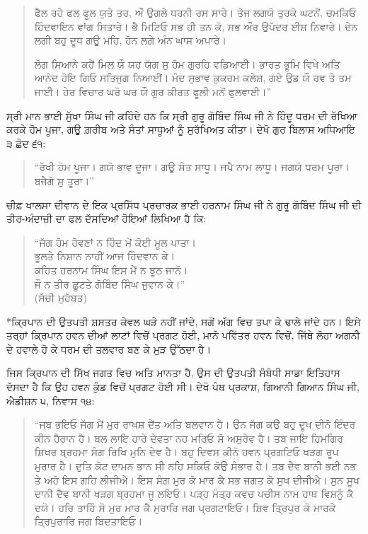 \documentclass[12pt,a5paper,twoside]{book}  %
\makeatletter
\renewcommand\section{\@startsection{section}{1}{0pt}{1.2em}{0.6em}{\punjabifont\Large\bfseries}}%
\makeatother
\begin{document}
{\begin{quote}
ਫੈਲ ਰਹੇ ਫਲ ਫੂਲ ਯੁਤੇ ਤਰ, ਔ ਉਗਲੇ ਧਰਨੀ ਰਸ ਸਾਰੇ। ਤੇਜ ਲਗਯੋ ਤੁਰਕੇ ਘਟਨੋਂ, ਚਮਕਿਓ ਹਿੰਦਵਾਇਨ ਵਾਂਗ ਸਿਤਾਰੇ। ਭੈ ਮਿਟਿਓ ਸਭ ਹੀ ਤਨ ਕੋ, ਸਭ ਔਰ ਉਪੱਦਰ ਈਸ਼ ਨਿਵਾਰੇ। ਦੇਨ ਲਗੀ ਬਹੁ ਦੂਧ ਗਊ ਮਹਿ, ਹੋਨ ਲਗੇ ਅੰਨ ਘਾਸ ਅਪਾਰੇ।

ਲੋਗ ਸਿਆਨੇ ਕਹੈਂ ਮਿਲ ਯੌ ਯਹ ਯੱਗ ਸੁ ਹੋਮ ਗੁਰਹਿ ਵਡਿਆਈ। ਭਾਰਤ ਭੂਮਿ ਵਿਖੇ ਅਤਿ ਆਨੰਦ ਹੋਇ ਗਿਓ ਸਤਿਜੁਗ ਨਿਆਈਂ। ਮੰਦ ਸੁਭਾਵ ਕੁਕਰਮ ਕਲੇਸ਼, ਗਏ ਉਡ ਯੌ ਰਵ ਤੇ ਤਮ ਜਾਈ। ਹੇਰ ਵਿਚਾਰ ਘਰੋ ਘਰ ਯੌ ਗੁਰ ਕੀਰਤ ਫੂਲੀ ਮਨੋਂ ਫੁਲਵਾਈ।”
\end{quote}
ਸ੍ਰੀ ਮਾਨ ਭਾਈ ਸੁੱਖਾ ਸਿੰਘ ਜੀ ਕਹਿੰਦੇ ਹਨ ਕਿ ਸ੍ਰੀ ਗੁਰੂ ਗੋਬਿੰਦ ਸਿੰਘ ਜੀ ਨੇ ਹਿੰਦੂ ਧਰਮ ਦੀ ਰੱਖਿਆ ਕਰਕੇ ਹੋਮ ਪੂਜਾ, ਗਊ ਗ਼ਰੀਬ ਅਤੇ ਸੰਤਾਂ ਸਾਧੂਆਂ ਨੂੰ ਸੁਰੱਖਿਅਤ ਕੀਤਾ। ਦੇਖੋ ਗੁਰ ਬਿਲਾਸ ਅਧਿਆਇ ੩ ਛੰਦ ੬੧:
\begin{quote}
“ਰੱਖੀ ਹੋਮ ਪੂਜਾ। ਗਯੋ ਭਾਵ ਦੂਜਾ। ਗਊ ਸੰਤ ਸਾਧੂ। ਜਪੈ ਨਾਮ ਲਾਧੂ। ਜਗਯੋ ਧਰਮ ਪੂਰਾ। ਬਜੈਗੋ ਸੁ ਤੂਰਾ।”
\end{quote}
ਚੀਫ਼ ਖਾਲਸਾ ਦੀਵਾਨ ਦੇ ਇਕ ਪ੍ਰਸਿੱਧ ਪ੍ਰਚਾਰਕ ਭਾਈ ਹਰਨਾਮ ਸਿੰਘ ਜੀ ਨੇ ਗੁਰੂ ਗੋਬਿੰਦ ਸਿੰਘ ਜੀ ਦੀ ਤੀਰ-ਅੰਦਾਜ਼ੀ ਦਾ ਫਲ ਦੱਸਦਿਆਂ ਹੋਇਆਂ ਲਿਖਿਆ ਹੈ ਕਿ:
\begin{quote}
“ਜੱਗ ਹੋਮ ਹੋਵਣਾਂ ਨ ਹਿੰਦ ਮੇਂ ਕੋਈ ਮੂਲ ਪਾਤਾ। \\
ਭੂਲਤੇ ਨਿਸ਼ਾਨ ਨਾਹੀਂ ਆਜ ਹਿੰਦਵਾਨ ਕੇ। \\
ਕਹਿਤ ਹਰਨਾਮ ਸਿੰਘ ਇਸ ਮੈਂ ਨ ਝੂਠ ਜਾਨੋ। \\
ਜੌ ਨ ਤੀਰ ਛੂਟਤੇ ਗੋਬਿੰਦ ਸਿੰਘ ਜੁਵਾਨ ਕੇ।” \\
(ਸੱਚੀ ਮੁਹੱਬਤ)
\end{quote}

\section*{ਕ੍ਰਿਪਾਨ ਦੀ ਉਤਪਤੀ}
ਸ਼ਸਤਰ ਕੇਵਲ ਘੜੇ ਨਹੀਂ ਜਾਂਦੇ, ਸਗੋਂ ਅੱਗ ਵਿਚ ਤਪਾ ਕੇ ਢਾਲੇ ਜਾਂਦੇ ਹਨ। ਇਸੇ ਤਰ੍ਹਾਂ ਕ੍ਰਿਪਾਨ ਹਵਨ ਦੀਆਂ ਲਾਟਾਂ ਵਿਚੋਂ ਪ੍ਰਗਟ ਹੋਈ, ਮਾਨੋ ਪਵਿੱਤਰ ਹਵਨ ਵਿਚੋਂ, ਜਿੱਥੇ ਲੋਹਾ ਅਗਨੀ ਦੇ ਹਵਾਲੇ ਹੋ ਕੇ ਧਰਮ ਦੀ ਤਲਵਾਰ ਬਣ ਕੇ ਮੁੜ ਉੱਠਦਾ ਹੈ।

ਜਿਸ ਕ੍ਰਿਪਾਨ ਦੀ ਸਿੱਖ ਜਗਤ ਵਿਚ ਅਤਿ ਮਾਨਤਾ ਹੈ, ਉਸ ਦੀ ਉਤਪਤੀ ਸੰਬੰਧੀ ਸਾਡਾ ਇਤਿਹਾਸ ਦੱਸਦਾ ਹੈ ਕਿ ਉਹ ਹਵਨ ਕੁੰਡ ਵਿਚੋਂ ਪ੍ਰਗਟ ਹੋਈ ਸੀ। ਦੇਖੋ ਪੰਥ ਪ੍ਰਕਾਸ਼, ਗਿਆਨੀ ਗਿਆਨ ਸਿੰਘ ਜੀ, ਐਡੀਸ਼ਨ ੫, ਨਿਵਾਸ ੧੪:
\begin{quote}
“ਜਬ ਭਇਓ ਜੱਗ ਮੈਂ ਮੁਰ ਰਾਖਸ਼ ਦੈਂਤ ਅਤਿ ਬਲਵਾਨ ਹੈ। ਉਨ ਜੱਗ ਕਉ ਬਹੁ ਦੂਖ ਦੀਨੋ ਇੰਦਰ ਕੀਨ ਹੈਰਾਨ ਹੈ। ਬਲ ਲਾਇ ਹਾਰੇ ਦੇਵਤਾ ਨਹ ਮਰਿਓ ਸੋ ਅਸੁਰੇਵ ਹੈ। ਤਬ ਜਾਇ ਹਿਮਗਿਰ ਸ਼ਿਖਰ ਬ੍ਰਹਮਾ ਸੰਗ ਰਿਖਿ ਮੁਨਿ ਦੇਵ ਹੈ। ਬਹੁ ਦਿਵਸ ਕੀਨੋ ਹਵਨ ਪ੍ਰਗਟਿਓ ਖੜਗ ਰੂਪ ਮੁਰਾਰ ਹੈ। ਦੁਤਿ ਕੋਟ ਦਾਮਨ ਭਾਨ ਸੀ ਨਹਿ ਸਕਿਓ ਕੋਉ ਸੰਭਾਰ ਹੈ। ਤਬ ਦੈਵ ਬਾਨੀ ਭਈ ਨਭ ਤੇ ਅਹੋ ਇਸ ਗਹਿ ਲੀਜੀਐ। ਇਸ ਸੰਗ ਮੁਰ ਕੋ ਮਾਰ ਕੈ ਸਭ ਜਗਤ ਕੋ ਸੁਖ ਦੀਜੀਐ। ਸੁਨ ਸੂਖ ਦਾਨੀ ਦੈਵ ਬਾਨੀ ਖੜਗ ਬ੍ਰਹਮਾ ਜੂ ਲਇਓ। ਪੜ੍ਹ ਮੰਤ੍ਰ ਕਵਚ ਪਚੀਸ ਨਾਮ ਹਾਥ ਵਿਸ਼ਨੂੰ ਕੈ ਦਯੋ। ਹਰਿ ਤਾਹਿੰ ਸੋ ਮੁਰ ਮਾਰ ਕੈ ਮੁਰਾਰਿ ਜਗ ਪ੍ਰਗਟਾਇਓ। ਸ਼ਿਵ ਤ੍ਰਿਪੁਰ ਕੋ ਮਾਰਕੇ ਤ੍ਰਿਪੁਰਾਰਿ ਜਗ ਬਿਦਤਾਇਓ।


\end{quote}}
\end{document}
